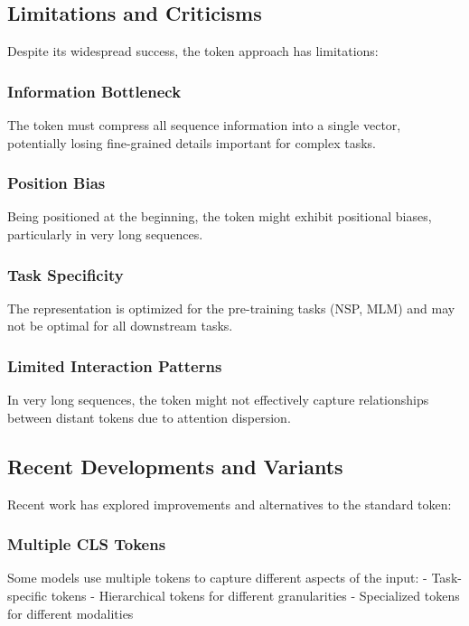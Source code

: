 \subsection{Limitations and Criticisms}

Despite its widespread success, the \cls{} token approach has limitations:

\subsubsection{Information Bottleneck}
The \cls{} token must compress all sequence information into a single vector, potentially losing fine-grained details important for complex tasks.

\subsubsection{Position Bias}
Being positioned at the beginning, the \cls{} token might exhibit positional biases, particularly in very long sequences.

\subsubsection{Task Specificity}
The \cls{} representation is optimized for the pre-training tasks (NSP, MLM) and may not be optimal for all downstream tasks.

\subsubsection{Limited Interaction Patterns}
In very long sequences, the \cls{} token might not effectively capture relationships between distant tokens due to attention dispersion.

\subsection{Recent Developments and Variants}

Recent work has explored improvements and alternatives to the standard \cls{} token:

\subsubsection{Multiple CLS Tokens}
Some models use multiple \cls{} tokens to capture different aspects of the input:
- Task-specific \cls{} tokens
- Hierarchical \cls{} tokens for different granularities
- Specialized \cls{} tokens for different modalities

